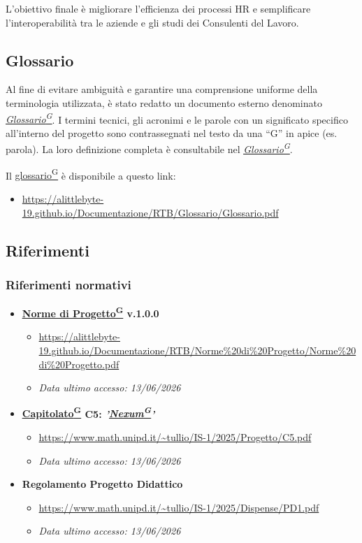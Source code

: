 \documentclass[a4paper,12pt]{article}
\providecommand{\glslink}[2]{\href{https://alittlebyte-19.github.io/Documentazione/glossario.html\#gls-#1}{\underline{#2}\textsuperscript{\scriptsize G}}}
\begin{document}
L'obiettivo finale è migliorare l'efficienza dei processi HR e semplificare l'interoperabilità tra le aziende e gli studi dei Consulenti del Lavoro.

\subsection{Glossario}
\label{sec:glossario}
Al fine di evitare ambiguità e garantire una comprensione uniforme della terminologia utilizzata, è stato redatto un documento esterno denominato \textit{\glslink{glossario}{Glossario}}.
I termini tecnici, gli acronimi e le parole con un significato specifico all'interno del progetto sono contrassegnati nel testo da una ``G'' in apice (es. parola\textsuperscript{}). La loro definizione completa è consultabile nel \textit{\glslink{glossario}{Glossario}}.


Il \glslink{glossario}{glossario} è disponibile a questo link:
\begin{itemize}
    \item \url{https://alittlebyte-19.github.io/Documentazione/RTB/Glossario/Glossario.pdf}
\end{itemize}

\subsection{Riferimenti}
\label{sec:riferimenti}
\subsubsection{Riferimenti normativi}
\begin{itemize}
    \item \textbf{\glslink{norme-di-progetto}{Norme di Progetto} v.1.0.0}
    \begin{itemize}
        \item \url{https://alittlebyte-19.github.io/Documentazione/RTB/Norme%20di%20Progetto/Norme%20di%20Progetto.pdf}
        \item \textit{Data ultimo accesso: 13/06/2026} 
    \end{itemize}
    \item \textbf{\glslink{capitolato}{Capitolato} C5: \textit{\textbf{'\glslink{nexum}{Nexum}'}}}
    \begin{itemize}
        \item \url{https://www.math.unipd.it/~tullio/IS-1/2025/Progetto/C5.pdf}
        \item \textit{Data ultimo accesso: 13/06/2026}
    \end{itemize}
     \item \textbf{Regolamento Progetto Didattico}
    \begin{itemize}
        \item \url{https://www.math.unipd.it/~tullio/IS-1/2025/Dispense/PD1.pdf}
        \item \textit{Data ultimo accesso: 13/06/2026}
    \end{itemize}
   
\end{itemize}
\end{document}
